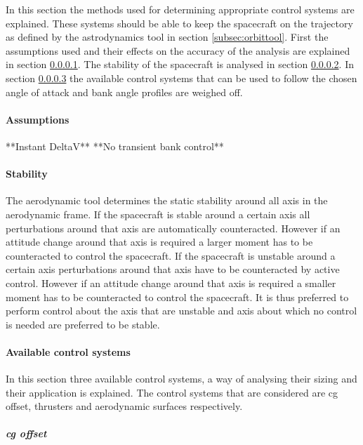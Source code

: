 In this section the methods used for determining appropriate control systems are explained. These systems should be able to keep the spacecraft on the trajectory as defined by the astrodynamics tool in section \ref{subsec:orbittool}. First the assumptions used and their effects on the accuracy of the analysis are explained in section \ref{control:assumptions}. The stability of the spacecraft is analysed in section \ref{control:stab}. In section \ref{control:system} the available control systems that can be used to follow the chosen angle of attack and bank angle profiles are weighed off.

\paragraph{Assumptions}
\label{control:assumptions}

**Instant DeltaV**
**No transient bank control**

\paragraph{Stability}
\label{control:stab}

The aerodynamic tool determines the static stability around all axis in the aerodynamic frame. If the spacecraft is stable around a certain axis all perturbations around that axis are automatically counteracted. However if an attitude change around that axis is required a larger moment has to be counteracted to control the spacecraft.  If the spacecraft is unstable around a certain axis perturbations around that axis have to be counteracted by active control. However if an attitude change around that axis is required a smaller moment has to be counteracted to control the spacecraft. It is thus preferred to perform control about the axis that are unstable and axis about which no control is needed are preferred to be stable.

\paragraph{Available control systems}
\label{control:system}

In this section three available control systems, a way of analysing their sizing and their application is explained. The control systems that are considered are \gls{cg} offset, thrusters and aerodynamic surfaces respectively.

\subparagraph{\acrlong{cg} offset}

